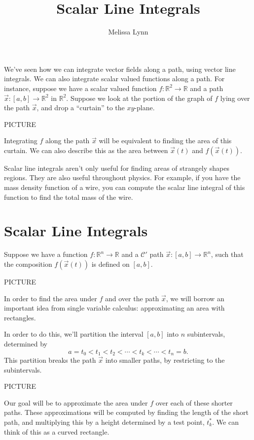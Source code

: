 \documentclass{ximera}
\title{Scalar Line Integrals}
\author{Melissa Lynn}
\begin{document}
\begin{abstract}
\end{abstract}
\maketitle

We've seen how we can integrate vector fields along a path, using vector line integrals. We can also integrate scalar valued functions along a path. For instance, suppose we have a scalar valued function $f:\mathbb{R}^2\rightarrow\mathbb{R}$ and a path $\vec{x}:[a,b]\rightarrow\mathbb{R}^2$ in $\mathbb{R}^2$. Suppose we look at the portion of the graph of $f$ lying over the path $\vec{x}$, and drop a ``curtain'' to the $xy$-plane.

PICTURE

Integrating $f$ along the path $\vec{x}$ will be equivalent to finding the area of this curtain. We can also describe this as the area between $\vec{x}(t)$ and $f(\vec{x}(t))$.

Scalar line integrals aren't only useful for finding areas of strangely shapes regions. They are also useful throughout physics. For example, if you have the mass density function of a wire, you can compute the scalar line integral of this function to find the total mass of the wire.

\section*{Scalar Line Integrals}

Suppose we have a function $f:\mathbb{R}^n\rightarrow\mathbb{R}$ and a $\mathcal{C}'$ path $\vec{x}:[a,b]\rightarrow\mathbb{R}^n$, such that the composition $f(\vec{x}(t))$ is defined on $[a,b]$.

PICTURE

In order to find the area under $f$ and over the path $\vec{x}$, we will borrow an important idea from single variable calculus: approximating an area with rectangles.

In order to do this, we'll partition the interval $[a,b]$ into $n$ subintervals, determined by
\[
a=t_0<t_1<t_2<\cdots < t_k < \cdots < t_n = b.
\]
This partition breaks the path $\vec{x}$ into smaller paths, by restricting to the subintervals.

PICTURE

Our goal will be to approximate the area under $f$ over each of these shorter paths. These approximations will be computed by finding the length of the short path, and multiplying this by a height determined by a test point, $t_k^*$. We can think of this as a curved rectangle.
\end{document}
